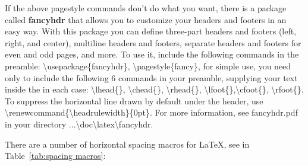 \documentclass[12pt,openright]{book}
\begin{document}
If the above pagestyle commands don’t do what you want, there is a package called \textbf{fancyhdr} that allows you to customize your headers and footers in an easy way. With
this package you can define three-part headers and footers (left, right, and center), multiline headers and footers, separate headers and footers for even and odd pages, and more.
To use it, include the following commands in the preamble: \textbackslash usepackage\{fancyhdr\}, \textbackslash pagestyle\{fancy\}, for simple use, you need only to include the following 6 commands in your preamble, supplying your text inside the {} in each case: \textbackslash lhead\{\}, \textbackslash chead\{\}, \textbackslash rhead\{\}, \textbackslash lfoot\{\},\textbackslash cfoot\{\}, \textbackslash rfoot\{\}. To suppress the horizontal line drawn by default under the header, use \textbackslash renewcommand\{\textbackslash headrulewidth\}\{0pt\}. For more information, see fancyhdr.pdf in your directory ...\textbackslash doc\textbackslash latex\textbackslash fancyhdr.

\noindent There are a number of horizontal spacing macros for \LaTeX, see in Table~\ref{tab:spacing macros}:
\end{document}
